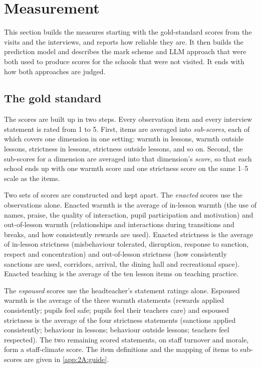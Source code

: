 \section{Measurement}
\label{sec:p1_measurement}

This section builds the measures starting with the gold-standard scores from the visits and
the interviews, and reports how reliable they are. It then builds the prediction model and describes
the mark scheme and LLM approach that were both used to
produce scores for the schools that were not visited. It ends with how both approaches are judged.

\subsection{The gold standard}

The scores are built up in two steps. Every observation item
and every interview statement is rated from 1 to 5. First, items are averaged into
\emph{sub-scores}, each of which covers one dimension in one setting: warmth
in lessons, warmth outside lessons, strictness in lessons, strictness outside
lessons, and so on. Second, the sub-scores for a dimension are averaged into
that dimension's \emph{score}, so that each school ends up with one warmth score and one strictness score on the same 1--5 scale as the items.

Two sets of scores are constructed and kept apart. The \emph{enacted} scores use the observations
alone. Enacted
warmth is the average of in-lesson warmth (the use of names, praise, the
quality of interaction, pupil participation and motivation) and
out-of-lesson warmth (relationships and interactions during transitions and
breaks, and how consistently rewards are used). Enacted strictness is the
average of in-lesson strictness (misbehaviour tolerated, disruption,
response to sanction, respect and concentration) and out-of-lesson
strictness (how consistently sanctions are used, corridors, arrival, the
dining hall and recreational space). Enacted teaching is the average of the
ten lesson items on teaching practice.

The \emph{espoused} scores use the
headteacher's statement ratings alone. Espoused warmth is the average of the
three warmth statements (rewards applied consistently; pupils feel safe;
pupils feel their teachers care) and espoused strictness is the average of
the four strictness statements (sanctions applied consistently; behaviour in
lessons; behaviour outside lessons; teachers feel respected). The two
remaining scored statements, on staff turnover and morale, form a
staff-climate score. The item definitions and the mapping of items to
sub-scores are given in \cref{app:2A:guide}.

